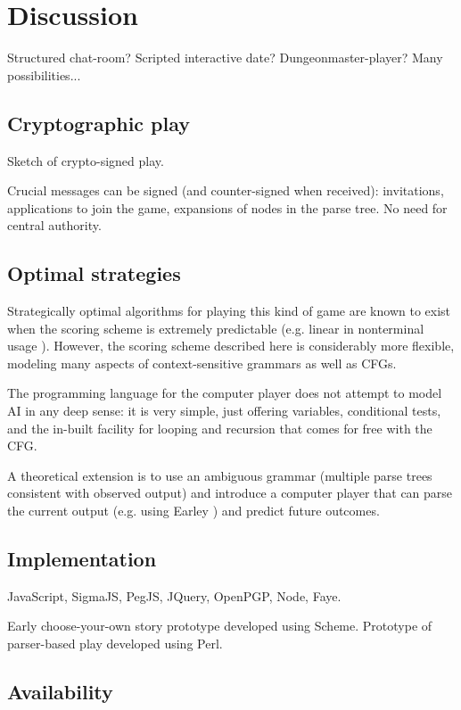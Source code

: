 \documentclass{acm_proc_article-sp}
\begin{document}
\section{Discussion}

Structured chat-room?
Scripted interactive date?
Dungeonmaster-player?
Many possibilities...


\subsection{Cryptographic play}

Sketch of crypto-signed play.

Crucial messages can be signed (and counter-signed when received): invitations, applications to join the game, expansions of nodes in the parse tree.
No need for central authority.

\subsection{Optimal strategies}

Strategically optimal algorithms for playing this kind of game are known to exist when the scoring scheme is extremely predictable (e.g. linear in nonterminal usage \cite{DBLP:conf/icalp/EtessamiWY08}).
However, the scoring scheme described here is considerably more flexible, modeling many aspects of context-sensitive grammars as well as CFGs.

The programming language for the computer player does not attempt to model AI in any deep sense:
it is very simple, just offering variables, conditional tests, and the in-built facility for looping and recursion that comes for free with the CFG.

A theoretical extension is to use an ambiguous grammar (multiple parse trees consistent with observed output)
and introduce a computer player that can parse the current output (e.g. using Earley \cite{Stolcke}) and predict future outcomes.

\subsection{Implementation}

JavaScript, SigmaJS, PegJS, JQuery, OpenPGP, Node, Faye.

Early choose-your-own story prototype developed using Scheme.
Prototype of parser-based play developed using Perl.


\subsection{Availability}
\end{document}
